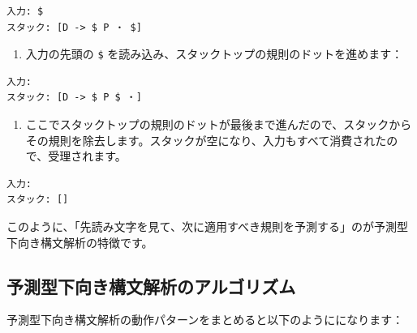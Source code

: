 \begin{verbatim}
入力: $
スタック: [D -> $ P ・ $]
\end{verbatim}

\begin{enumerate}
\def\labelenumi{\arabic{enumi}.}
\setcounter{enumi}{12}
\tightlist
\item
  入力の先頭の \texttt{\$}
  を読み込み、スタックトップの規則のドットを進めます：
\end{enumerate}

\begin{verbatim}
入力:
スタック: [D -> $ P $ ・]
\end{verbatim}

\begin{enumerate}
\def\labelenumi{\arabic{enumi}.}
\setcounter{enumi}{13}
\tightlist
\item
  ここでスタックトップの規則のドットが最後まで進んだので、スタックからその規則を除去します。スタックが空になり、入力もすべて消費されたので、受理されます。
\end{enumerate}

\begin{verbatim}
入力:
スタック: []
\end{verbatim}

このように、「先読み文字を見て、次に適用すべき規則を予測する」のが予測型下向き構文解析の特徴です。

\hypertarget{chapter5-ux4e88ux6e2cux578bux4e0bux5411ux304dux69cbux6587ux89e3ux6790ux306eux30a2ux30ebux30b4ux30eaux30baux30e0}{%
\subsection{予測型下向き構文解析のアルゴリズム}\label{chapter5-ux4e88ux6e2cux578bux4e0bux5411ux304dux69cbux6587ux89e3ux6790ux306eux30a2ux30ebux30b4ux30eaux30baux30e0}}

予測型下向き構文解析の動作パターンをまとめると以下のようにになります：

